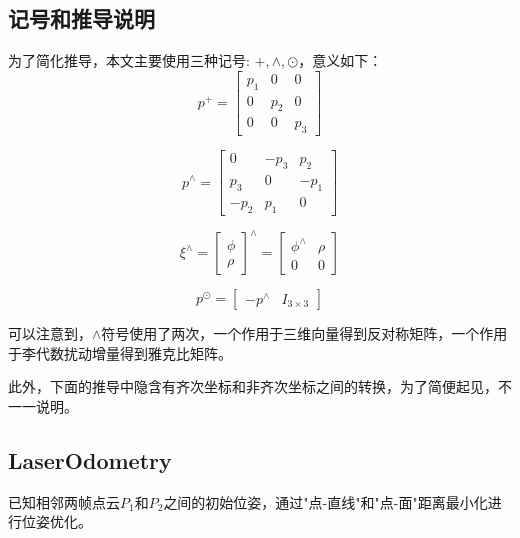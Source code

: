 \documentclass{ctexart}
\begin{document}
{	\subsection{记号和推导说明}
	为了简化推导，本文主要使用三种记号: $+,\wedge,\odot$，意义如下：
	\begin{equation}
	p^+=\begin{bmatrix}
	p_1 & 0 & 0 \\
	0 & p_2 & 0 \\
	0 & 0 & p_3
	\end{bmatrix}
	\end{equation}

	\begin{equation}
	p^\wedge=\begin{bmatrix}
	0 & -p_3 & p_2 \\
	p_3 & 0 & -p_1 \\
	-p_2 & p_1 & 0
	\end{bmatrix}
	\end{equation}

	\begin{equation}
	\xi^\wedge
	=\begin{bmatrix}
	\phi \\ \rho
	\end{bmatrix}^\wedge
	=\begin{bmatrix}
	\phi^\wedge & \rho \\
	0 & 0
	\end{bmatrix}
	\end{equation}

	\begin{equation}
	p^\odot=\begin{bmatrix}
	-p^\wedge & I_{3\times3}
	\end{bmatrix}
	\end{equation}
	
	\par 可以注意到，$\wedge$符号使用了两次，一个作用于三维向量得到反对称矩阵，一个作用于李代数扰动增量得到雅克比矩阵。
	\par 此外，下面的推导中隐含有齐次坐标和非齐次坐标之间的转换，为了简便起见，不一一说明。
	
	\subsection{LaserOdometry}
	已知相邻两帧点云$P_1$和$P_2$之间的初始位姿，通过"点-直线"和"点-面"距离最小化进行位姿优化。
}
\end{document}

